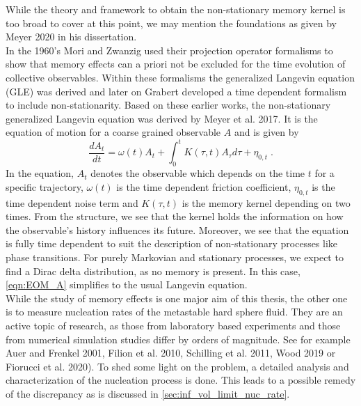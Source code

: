 While the theory and framework to obtain the non-stationary memory kernel is too broad to cover at this point, we may mention the foundations as given by Meyer 2020\cite{MeyerThesis} in his dissertation.\\

In the 1960's Mori and Zwanzig used their projection operator formalisms to show that memory effects can a priori not be excluded for the time evolution of collective observables. Within these formalisms the generalized Langevin equation (GLE) was derived and later on Grabert developed a time dependent formalism to include non-stationarity. Based on these earlier works, the non-stationary generalized Langevin equation was derived by Meyer et al. 2017\cite{Meyer_nsGLE}. It is the equation of motion for a coarse grained observable $A$ and is given by
\begin{equation}
\label{eqn:EOM_A}
  \frac{d A_{t}}{dt} = \omega (t) A_{t} + \int_{0}^{t} K(\tau, t) A_{\tau} d\tau + \eta_{0,t} \; \text{.}
\end{equation}
In the equation, $A_{t}$ denotes the observable which depends on the time $t$ for a specific trajectory, $\omega (t)$ is the time dependent friction coefficient, $\eta_{0,t}$ is the time dependent noise term and $K(\tau, t)$ is the memory kernel depending on two times. From the structure, we see that the kernel holds the information on how the observable's history influences its future. Moreover, we see that the equation is fully time dependent to suit the description of non-stationary processes like phase transitions. For purely Markovian and stationary processes, we expect to find a Dirac delta distribution, as no memory is present. In this case, \autoref{eqn:EOM_A} simplifies to the usual Langevin equation.\\

While the study of memory effects is one major aim of this thesis, the other one is to measure nucleation rates of the metastable hard sphere fluid. They are an active topic of research, as those from laboratory based experiments and those from numerical simulation studies differ by orders of magnitude. See for example Auer and Frenkel 2001\cite{Auer2001}, Filion et al. 2010\cite{Filion2010}, Schilling et al. 2011\cite{Schilling2011}, Wood 2019\cite{Wood2019} or Fiorucci et al. 2020\cite{Fiorucci2020a}). To shed some light on the problem, a detailed analysis and characterization of the nucleation process is done. This leads to a possible remedy of the discrepancy as is discussed in \autoref{sec:inf_vol_limit_nuc_rate}.


